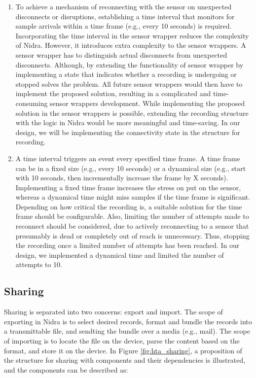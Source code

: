 \begin{enumerate}
    \item To achieve a mechanism of reconnecting with the sensor on unexpected disconnects or disruptions, establishing a time interval that monitors for sample arrivals within a time frame (e.g., every 10 seconds) is required. Incorporating the time interval in the sensor wrapper reduces the complexity of Nidra. However, it introduces extra complexity to the sensor wrappers. A sensor wrapper has to distinguish actual disconnects from unexpected disconnects. Although, by extending the functionality of sensor wrapper by implementing a state that indicates whether a recording is undergoing or stopped solves the problem. All future sensor wrappers would then have to implement the proposed solution, resulting in a complicated and time-consuming sensor wrappers development. While implementing the proposed solution in the sensor wrappers is possible, extending the recording structure with the logic in Nidra would be more meaningful and time-saving. In our design, we will be implementing the connectivity state in the structure for recording.
    \item A time interval triggers an event every specified time frame. A time frame can be in a fixed size (e.g., every 10 seconds) or a dynamical size (e.g., start with 10 seconds, then incrementally increase the frame by X seconds). Implementing a fixed time frame increases the stress on put on the sensor, whereas a dynamical time might miss samples if the time frame is significant. Depending on how critical the recording is, a suitable solution for the time frame should be configurable. Also, limiting the number of attempts made to reconnect should be considered, due to actively reconnecting to a sensor that presumably is dead or completely out of reach is unnecessary. Thus, stopping the recording once a limited number of attempts has been reached.  In our design, we implemented a dynamical time and limited the number of attempts to 10. 
\end{enumerate}

\subsection{Sharing} \label{sec:design_sharing}

Sharing is separated into two concerns: export and import. The scope of exporting in Nidra is to select desired records, format and bundle the records into a transmittable file, and sendting the bundle over a media (e.g., mail). The scope of importing is to locate the file on the device, parse the content based on the format, and store it on the device. In Figure \ref{fig:hta_sharing}, a proposition of the structure for sharing with components and their dependencies is illustrated, and the components can be described as:


